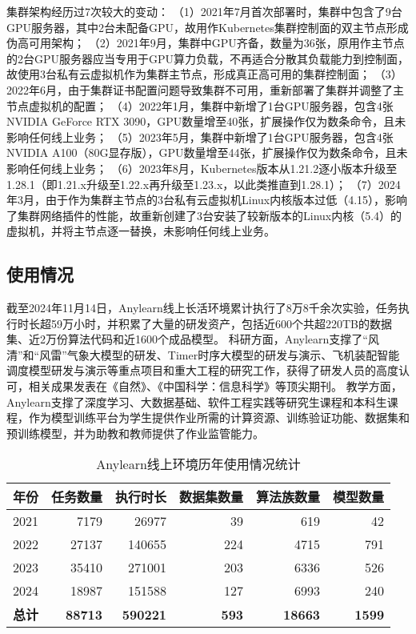 集群架构经历过7次较大的变动：
（1）2021年7月首次部署时，集群中包含了9台GPU服务器，其中2台未配备GPU，故用作Kubernetes集群控制面的双主节点形成伪高可用架构；
（2）2021年9月，集群中GPU齐备，数量为36张，原用作主节点的2台GPU服务器应当专用于GPU算力负载，不再适合分散其负载能力到控制面，故使用3台私有云虚拟机作为集群主节点，形成真正高可用的集群控制面； 
（3）2022年6月，由于集群证书配置问题导致集群不可用，重新部署了集群并调整了主节点虚拟机的配置；
（4）2022年1月，集群中新增了1台GPU服务器，包含4张NVIDIA GeForce RTX 3090，GPU数量增至40张，扩展操作仅为数条命令，且未影响任何线上业务；
（5）2023年5月，集群中新增了1台GPU服务器，包含4张NVIDIA A100（80G显存版），GPU数量增至44张，扩展操作仅为数条命令，且未影响任何线上业务；
（6）2023年8月，Kubernetes版本从1.21.2逐小版本升级至1.28.1（即1.21.x升级至1.22.x再升级至1.23.x，以此类推直到1.28.1）；
（7）2024年3月，由于作为集群主节点的3台私有云虚拟机Linux内核版本过低（4.15），影响了集群网络插件的性能，故重新创建了3台安装了较新版本的Linux内核（5.4）的虚拟机，并将主节点逐一替换，未影响任何线上业务。

\subsection{使用情况}
截至2024年11月14日，Anylearn线上长活环境累计执行了8万8千余次实验，任务执行时长超59万小时，并积累了大量的研发资产，包括近600个共超220TB的数据集、近2万份算法代码和近1600个成品模型。
科研方面，Anylearn支撑了“风清”和“风雷”气象大模型的研发、Timer时序大模型的研发与演示、飞机装配智能调度模型研发与演示等重点项目和重大工程的研究工作，获得了研发人员的高度认可，相关成果发表在《自然》\cite{Zha23}、《中国科学：信息科学》\cite{Zho24}等顶尖期刊。
教学方面，Anylearn支撑了深度学习、大数据基础、软件工程实践等研究生课程和本科生课程，作为模型训练平台为学生提供作业所需的计算资源、训练验证功能、数据集和预训练模型，并为助教和教师提供了作业监管能力。

\begin{table}
  \centering
  \caption{Anylearn线上环境历年使用情况统计}
  \begin{tabular}{crrrrr}
    \toprule
    \multicolumn{1}{c}{年份} & \multicolumn{1}{c}{任务数量} & \multicolumn{1}{c}{执行时长} & \multicolumn{1}{c}{数据集数量} & \multicolumn{1}{c}{算法族数量} & \multicolumn{1}{c}{模型数量} \\
    \midrule
    2021 & 7179 & 26977 & 39 & 619 & 42 \\
    2022 & 27137 & 140655 & 224 & 4715 & 791 \\
    2023 & 35410 & 271001 & 203 & 6336 & 526 \\
    2024 & 18987 & 151588 & 127 & 6993 & 240 \\
    \textbf{总计} & \textbf{88713} & \textbf{590221} & \textbf{593} & \textbf{18663} & \textbf{1599} \\
    \bottomrule
  \end{tabular}
  \label{tab:stats}
\end{table}

